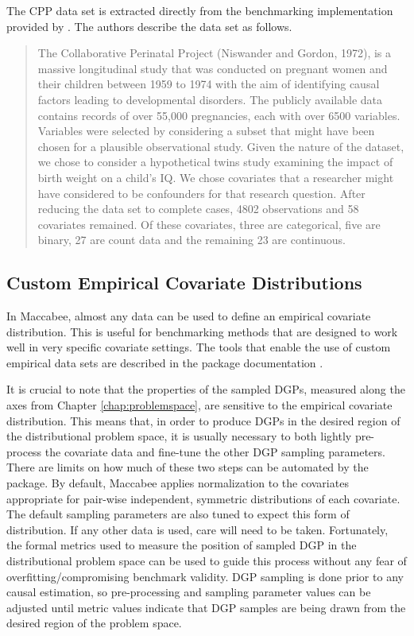 \documentclass[../main.tex]{subfiles}
\begin{document}
The CPP data set is extracted directly from the benchmarking implementation provided by \textcite{Dorie2019Automated1}. The authors describe the data set as follows.

\begin{quote}
    The Collaborative Perinatal Project (Niswander and Gordon, 1972), is a massive longitudinal study that was conducted on pregnant women and their children between 1959 to 1974 with the aim of identifying causal factors leading to developmental disorders. The publicly available data contains records of over 55,000 pregnancies, each with over 6500 variables. Variables were selected by considering a subset that might have been chosen for a plausible observational study. Given the nature of the dataset, we chose to consider a hypothetical twins study examining the impact of birth weight on a child’s IQ. We chose covariates that a researcher might have considered to be confounders for that research question. After reducing the data set to complete cases, 4802 observations and 58 covariates remained. Of these covariates, three are categorical, five are binary, 27 are count data and the remaining 23 are continuous.
\end{quote}


\subsection{Custom Empirical Covariate Distributions}

 In Maccabee, almost any data can be used to define an empirical covariate distribution. This is useful for benchmarking methods that are designed to work well in very specific covariate settings. The tools that enable the use of custom empirical data sets are described in the package documentation .

 \vspace{\baselineskip}

 It is crucial to note that the properties of the sampled DGPs, measured along the axes from Chapter \ref{chap:problemspace}, are sensitive to the empirical covariate distribution. This means that, in order to produce DGPs in the desired region of the distributional problem space, it is usually necessary to both lightly pre-process the covariate data and fine-tune the other DGP sampling parameters. There are limits on how much of these two steps can be automated by the package. By default, Maccabee applies normalization to the covariates appropriate for pair-wise independent, symmetric distributions of each covariate. The default sampling parameters are also tuned to expect this form of distribution. If any other data is used, care will need to be taken. Fortunately, the formal metrics used to measure the position of sampled DGP in the distributional problem space can be used to guide this process without any fear of overfitting/compromising benchmark validity. DGP sampling is done prior to any causal estimation, so pre-processing and sampling parameter values can be adjusted until metric values indicate that DGP samples are being drawn from the desired region of the problem space.
\end{document}
